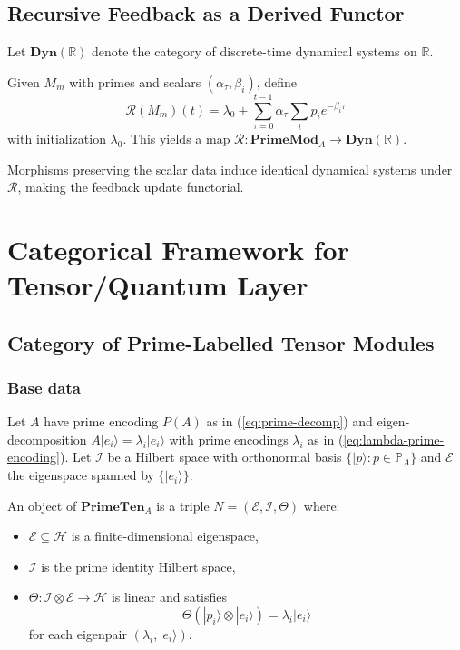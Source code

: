 \documentclass[11pt]{article}
\begin{document}
\subsection{Recursive Feedback as a Derived Functor}

Let $\mathbf{Dyn}(\mathbb{R})$ denote the category of discrete-time
dynamical systems on $\mathbb{R}$.

\begin{definition}
Given $M_m$ with primes and scalars $(\alpha_\tau,\beta_i)$, define
\[
\mathcal{R}(M_m)(t) = \lambda_0 +
\sum_{\tau=0}^{t-1}
\alpha_\tau \sum_{i} p_i e^{-\beta_i \tau}
\]
with initialization $\lambda_0$. This yields a map
$\mathcal{R} : \mathbf{PrimeMod}_A \to
\mathbf{Dyn}(\mathbb{R})$.
\end{definition}

Morphisms preserving the scalar data induce identical dynamical systems
under $\mathcal{R}$, making the feedback update functorial.

\section{Categorical Framework for Tensor/Quantum Layer}

\subsection{Category of Prime-Labelled Tensor Modules}

\subsubsection*{Base data}

Let $A$ have prime encoding $P(A)$ as in (\ref{eq:prime-decomp}) and
eigen-decomposition $A |e_i\rangle = \lambda_i |e_i\rangle$ with
prime encodings $\lambda_i$ as in (\ref{eq:lambda-prime-encoding}).\cite{PrimeEigenSolvers}
Let $\mathcal{I}$ be a Hilbert space with orthonormal basis
$\{|p\rangle : p\in\mathbb{P}_A\}$ and $\mathcal{E}$ the eigenspace
spanned by $\{|e_i\rangle\}$.\cite{PrimeEigenSolvers}

\begin{definition}
An object of $\mathbf{PrimeTen}_A$ is a triple
$N=(\mathcal{E},\mathcal{I},\Theta)$ where:
\begin{itemize}
  \item $\mathcal{E}\subseteq\mathcal{H}$ is a finite-dimensional
    eigenspace,
  \item $\mathcal{I}$ is the prime identity Hilbert space,
  \item $\Theta : \mathcal{I}\otimes\mathcal{E} \to \mathcal{H}$ is
    linear and satisfies
    \[
    \Theta(|p_i\rangle\otimes|e_i\rangle) = \lambda_i |e_i\rangle
    \]
    for each eigenpair $(\lambda_i,|e_i\rangle)$.
\end{itemize}
\end{definition}
\end{document}
